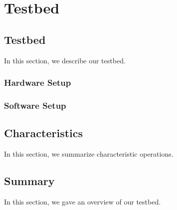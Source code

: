 \chapter{Testbed}
\label{chap:testbed}



\section{Testbed}
\label{sec:testbed}

In this section, we describe our testbed.

\subsection{Hardware Setup}
\label{sec:testbed:hardware}



\subsection{Software Setup}
\label{sec:testbed:software}
%



\section{Characteristics}
\label{sec:characteristics}

In this section, we summarize characteristic operations.
%

\section{Summary}
\label{sec:conclusion}

In this section, we gave an overview of our testbed.
%